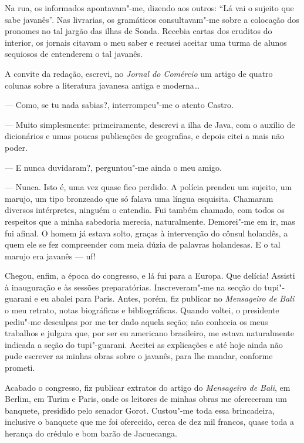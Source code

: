 Na rua, os informados apontavam"-me, dizendo aos outros: ``Lá vai o
sujeito que sabe javanês''. Nas livrarias, os gramáticos consultavam"-me
sobre a colocação dos pronomes no tal jargão das ilhas de Sonda. Recebia
cartas dos eruditos do interior, os jornais citavam o meu saber e
recusei aceitar uma turma de alunos sequiosos de entenderem o tal
javanês.

A convite da redação, escrevi, no \emph{Jornal do Comércio} um artigo de
quatro colunas sobre a literatura javanesa antiga e moderna\ldots{}

--- Como, se tu nada sabias?, interrompeu"-me o atento Castro.

--- Muito simplesmente: primeiramente, descrevi a ilha de Java, com o
auxílio de dicionários e umas poucas publicações de geografias, e depois
citei a mais não poder.

--- E nunca duvidaram?, perguntou"-me ainda o meu amigo.

--- Nunca. Isto é, uma vez quase fico perdido. A polícia prendeu um
sujeito, um marujo, um tipo bronzeado que só falava uma língua
esquisita. Chamaram diversos intérpretes, ninguém o entendia. Fui também
chamado, com todos os respeitos que a minha sabedoria merecia,
naturalmente. Demorei"-me em ir, mas fui afinal. O homem já estava solto,
graças à intervenção do cônsul holandês, a quem ele se fez compreender
com meia dúzia de palavras holandesas. E o tal marujo era javanês ---
uf!

Chegou, enfim, a época do congresso, e lá fui para a Europa. Que
delícia! Assisti à inauguração e às sessões preparatórias.
Inscreveram"-me na secção do tupi"-guarani e eu abalei para Paris. Antes,
porém, fiz publicar no \emph{Mensageiro de Bali} o meu retrato, notas
biográficas e bibliográficas. Quando voltei, o presidente pediu"-me
desculpas por me ter dado aquela seção; não conhecia os meus trabalhos e
julgara que, por ser eu americano brasileiro, me estava naturalmente
indicada a seção do tupi"-guarani. Aceitei as explicações e até hoje
ainda não pude escrever as minhas obras sobre o javanês, para lhe
mandar, conforme prometi.

Acabado o congresso, fiz publicar extratos do artigo do \emph{Mensageiro
de Bali}, em Berlim, em Turim e Paris, onde os leitores de minhas obras
me ofereceram um banquete, presidido pelo senador Gorot. Custou"-me toda
essa brincadeira, inclusive o banquete que me foi oferecido, cerca de
dez mil francos, quase toda a herança do crédulo e bom barão de
Jacuecanga.

